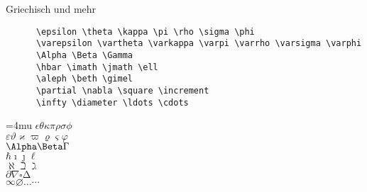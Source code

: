 \begin{frame}[fragile]{Griechisch und mehr}
  \begin{CodeExample}{0.72}
    \begin{lstlisting}
      \epsilon \theta \kappa \pi \rho \sigma \phi
      \varepsilon \vartheta \varkappa \varpi \varrho \varsigma \varphi
      \Alpha \Beta \Gamma
      \hbar \imath \jmath \ell
      \aleph \beth \gimel
      \partial \nabla \square \increment
      \infty \diameter \ldots \cdots
    \end{lstlisting}
  \CodeResult
    \Umathordordspacing\textstyle=4mu
    $\epsilon \theta \kappa \pi \rho \sigma \phi$ \\
    $\varepsilon \vartheta \varkappa \varpi \varrho \varsigma \varphi$ \\[\baselineskip]
    $\Alpha \Beta \Gamma$ \\
    $\hbar \imath \jmath \ell$ \\
    $\aleph \beth \gimel$ \\
    $\partial \nabla \square \increment$ \\
    $\infty \diameter \ldots \cdots$
  \end{CodeExample}
\end{frame}

